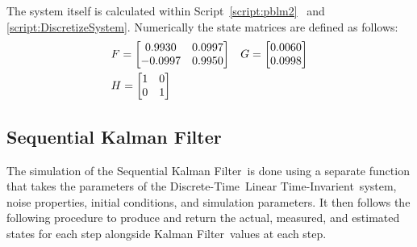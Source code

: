 \documentclass[]{article}
\renewcommand{\lstlistingname}{Script}
\newcommand{\scriptname}{\lstlistingname}
\newcommand{\KF}{Kalman Filter}
\newcommand{\DT}{Discrete-Time}
\newcommand{\LTI}{Linear Time-Invarient}
\begin{document}
		The system itself is calculated within \scriptname \ \ref{script:pblm2} \ and \ref{script:DiscretizeSystem}. Numerically the state matrices are defined as follows:
		\begin{equation}
			\begin{aligned}
				&F = \mqty[	0.9930 & 0.0997\\
							-0.0997& 0.9950]
				&&G = \mqty[0.0060\\ 0.0998]\\
				&H = \mqty[\imat{2}]
			\end{aligned}
		\end{equation}
	
	\subsection{Sequential \KF}
		The simulation of the Sequential \KF \ is done using a separate function that takes the parameters of the \DT \ \LTI \ system, noise properties, initial conditions, and simulation parameters. It then follows the following procedure to produce and return the actual, measured, and estimated states for each step alongside \KF \ values at each step.
\end{document}
